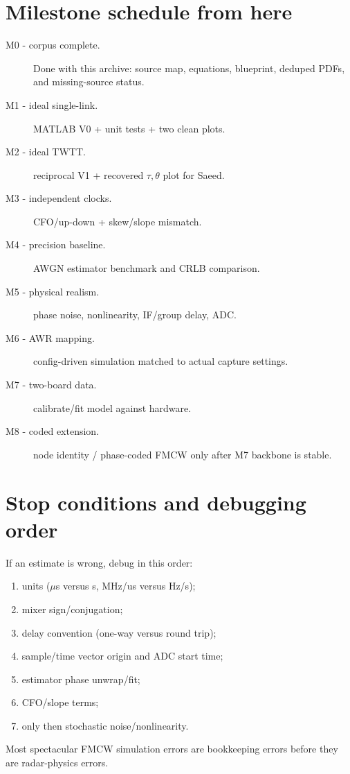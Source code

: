 \documentclass[11pt]{article}
\begin{document}
\section{Milestone schedule from here}
\begin{description}
\item[M0 - corpus complete.] Done with this archive: source map, equations, blueprint, deduped PDFs, and missing-source status.
\item[M1 - ideal single-link.] MATLAB V0 + unit tests + two clean plots.
\item[M2 - ideal TWTT.] reciprocal V1 + recovered $\tau,\theta$ plot for Saeed.
\item[M3 - independent clocks.] CFO/up-down + skew/slope mismatch.
\item[M4 - precision baseline.] AWGN estimator benchmark and CRLB comparison.
\item[M5 - physical realism.] phase noise, nonlinearity, IF/group delay, ADC.
\item[M6 - AWR mapping.] config-driven simulation matched to actual capture settings.
\item[M7 - two-board data.] calibrate/fit model against hardware.
\item[M8 - coded extension.] node identity / phase-coded FMCW only after M7 backbone is stable.
\end{description}

\section{Stop conditions and debugging order}
If an estimate is wrong, debug in this order:
\begin{enumerate}
\item units ($\mu$s versus s, MHz/us versus Hz/s);
\item mixer sign/conjugation;
\item delay convention (one-way versus round trip);
\item sample/time vector origin and ADC start time;
\item estimator phase unwrap/fit;
\item CFO/slope terms;
\item only then stochastic noise/nonlinearity.
\end{enumerate}
Most spectacular FMCW simulation errors are bookkeeping errors before they are radar-physics errors.
\end{document}

